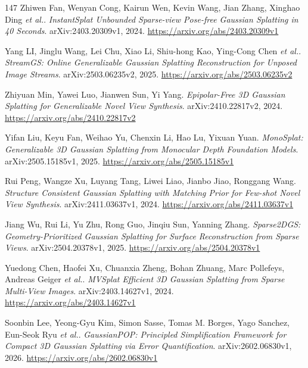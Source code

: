 \documentclass[11pt,a4paper]{article}
\begin{document}
\begin{thebibliography}{147}
Zhiwen Fan, Wenyan Cong, Kairun Wen, Kevin Wang, Jian Zhang, Xinghao Ding \emph{et al.}.
\newblock \emph{InstantSplat Unbounded Sparse-view Pose-free Gaussian Splatting in 40 Seconds}.
\newblock arXiv:2403.20309v1, 2024.
\newblock \url{https://arxiv.org/abs/2403.20309v1}

Yang LI, Jinglu Wang, Lei Chu, Xiao Li, Shiu-hong Kao, Ying-Cong Chen \emph{et al.}.
\newblock \emph{StreamGS: Online Generalizable Gaussian Splatting Reconstruction for Unposed Image Streams}.
\newblock arXiv:2503.06235v2, 2025.
\newblock \url{https://arxiv.org/abs/2503.06235v2}

Zhiyuan Min, Yawei Luo, Jianwen Sun, Yi Yang.
\newblock \emph{Epipolar-Free 3D Gaussian Splatting for Generalizable Novel View Synthesis}.
\newblock arXiv:2410.22817v2, 2024.
\newblock \url{https://arxiv.org/abs/2410.22817v2}

Yifan Liu, Keyu Fan, Weihao Yu, Chenxin Li, Hao Lu, Yixuan Yuan.
\newblock \emph{MonoSplat: Generalizable 3D Gaussian Splatting from Monocular Depth Foundation Models}.
\newblock arXiv:2505.15185v1, 2025.
\newblock \url{https://arxiv.org/abs/2505.15185v1}

Rui Peng, Wangze Xu, Luyang Tang, Liwei Liao, Jianbo Jiao, Ronggang Wang.
\newblock \emph{Structure Consistent Gaussian Splatting with Matching Prior for Few-shot Novel View Synthesis}.
\newblock arXiv:2411.03637v1, 2024.
\newblock \url{https://arxiv.org/abs/2411.03637v1}

Jiang Wu, Rui Li, Yu Zhu, Rong Guo, Jinqiu Sun, Yanning Zhang.
\newblock \emph{Sparse2DGS: Geometry-Prioritized Gaussian Splatting for Surface Reconstruction from Sparse Views}.
\newblock arXiv:2504.20378v1, 2025.
\newblock \url{https://arxiv.org/abs/2504.20378v1}

Yuedong Chen, Haofei Xu, Chuanxia Zheng, Bohan Zhuang, Marc Pollefeys, Andreas Geiger \emph{et al.}.
\newblock \emph{MVSplat Efficient 3D Gaussian Splatting from Sparse Multi-View Images}.
\newblock arXiv:2403.14627v1, 2024.
\newblock \url{https://arxiv.org/abs/2403.14627v1}

Soonbin Lee, Yeong-Gyu Kim, Simon Sasse, Tomas M. Borges, Yago Sanchez, Eun-Seok Ryu \emph{et al.}.
\newblock \emph{GaussianPOP: Principled Simplification Framework for Compact 3D Gaussian Splatting via Error Quantification}.
\newblock arXiv:2602.06830v1, 2026.
\newblock \url{https://arxiv.org/abs/2602.06830v1}


\end{thebibliography}
\end{document}
